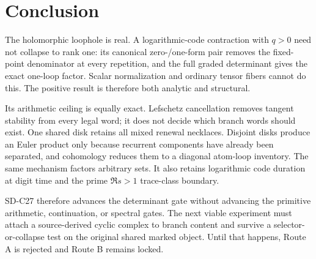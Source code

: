 \section{Conclusion}
\label{sec:conclusion}

The holomorphic loophole is real.  A logarithmic-code contraction with
\(q>0\) need not collapse to rank one: its canonical zero-/one-form pair
removes the fixed-point denominator at every repetition, and the full
graded determinant gives the exact one-loop factor.  Scalar normalization
and ordinary tensor fibers cannot do this.  The positive result is therefore
both analytic and structural.

Its arithmetic ceiling is equally exact.  Lefschetz cancellation removes
tangent stability from every legal word; it does not decide which branch
words should exist.  One shared disk retains all mixed renewal necklaces.
Disjoint disks produce an Euler product only because recurrent components
have already been separated, and cohomology reduces them to a diagonal
atom-loop inventory.  The same mechanism factors arbitrary sets.  It also
retains logarithmic code duration at digit time and the prime
\(\Re s>1\) trace-class boundary.

SD-C27 therefore advances the determinant gate without advancing the
primitive arithmetic, continuation, or spectral gates.  The next viable
experiment must attach a source-derived cyclic complex to branch content
and survive a selector-or-collapse test on the original shared marked
object.  Until that happens, Route A is rejected and Route B remains locked.
